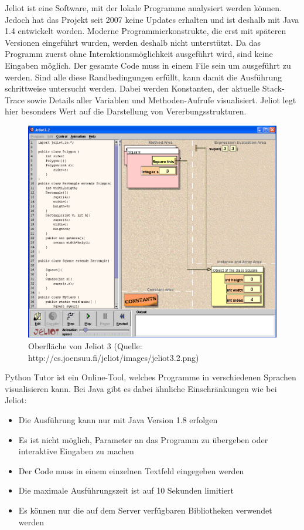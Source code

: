 Jeliot ist eine Software, mit der lokale Programme analysiert werden können. Jedoch hat das Projekt seit 2007 keine Updates erhalten und ist deshalb mit Java 1.4 entwickelt worden. Moderne Programmierkonstrukte, die erst mit späteren Versionen eingeführt wurden, werden deshalb nicht unterstützt. Da das Programm zuerst ohne Interaktionsmöglichkeit ausgeführt wird, sind keine Eingaben möglich. Der gesamte Code muss in einem File sein um ausgeführt zu werden. Sind alle diese Randbedingungen erfüllt, kann damit die Ausführung schrittweise untersucht werden. Dabei werden Konstanten, der aktuelle Stack-Trace sowie Details aller Variablen und Methoden-Aufrufe visualisiert. Jeliot legt hier besonders Wert auf die Darstellung von Vererbungsstrukturen.

\begin{figure}[h]
	\includegraphics[width=\textwidth]{analyse/bilder/jeliot3.png}
	\caption{Oberfläche von Jeliot 3 (Quelle: http://cs.joensuu.fi/jeliot/images/jeliot3.2.png)}
\end{figure}

Python Tutor ist ein Online-Tool, welches Programme in verschiedenen Sprachen visualisieren kann. Bei Java gibt es dabei ähnliche Einschränkungen wie bei Jeliot:
\begin{itemize}
	\item Die Ausführung kann nur mit Java Version 1.8 erfolgen
	\item Es ist nicht möglich, Parameter an das Programm zu übergeben oder interaktive Eingaben zu machen
	\item Der Code muss in einem einzelnen Textfeld eingegeben werden
	\item Die maximale Ausführungszeit ist auf 10 Sekunden limitiert
	\item Es können nur die auf dem Server verfügbaren Bibliotheken verwendet werden
\end{itemize}

